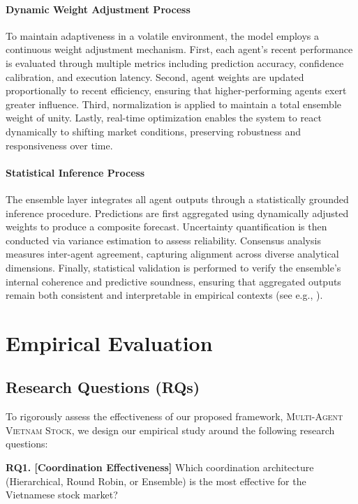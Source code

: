 \documentclass{ieeeaccess}
\begin{document}
\paragraph{Dynamic Weight Adjustment Process}
To maintain adaptiveness in a volatile environment, the model employs a continuous weight adjustment mechanism.  
First, each agent’s recent performance is evaluated through multiple metrics including prediction accuracy, confidence calibration, and execution latency.  
Second, agent weights are updated proportionally to recent efficiency, ensuring that higher-performing agents exert greater influence.  
Third, normalization is applied to maintain a total ensemble weight of unity.  
Lastly, real-time optimization enables the system to react dynamically to shifting market conditions, preserving robustness and responsiveness over time.\cite{McAndrew2021,Lu2023}

\paragraph{Statistical Inference Process}
The ensemble layer integrates all agent outputs through a statistically grounded inference procedure.  
Predictions are first aggregated using dynamically adjusted weights to produce a composite forecast.  
Uncertainty quantification is then conducted via variance estimation to assess reliability.  
Consensus analysis measures inter-agent agreement, capturing alignment across diverse analytical dimensions.  
Finally, statistical validation is performed to verify the ensemble’s internal coherence and predictive soundness, ensuring that aggregated outputs remain both consistent and interpretable in empirical contexts (see e.g., \cite{wang2021,li2022}). 






\section{Empirical Evaluation}
\subsection{Research Questions (RQs)}
To rigorously assess the effectiveness of our proposed framework, \textsc{Multi-Agent Vietnam Stock}, we design our empirical study around the following research questions:

\textbf{RQ1. [Coordination Effectiveness]}  
Which coordination architecture (Hierarchical, Round Robin, or Ensemble) is the most effective for the Vietnamese stock market?
\end{document}
